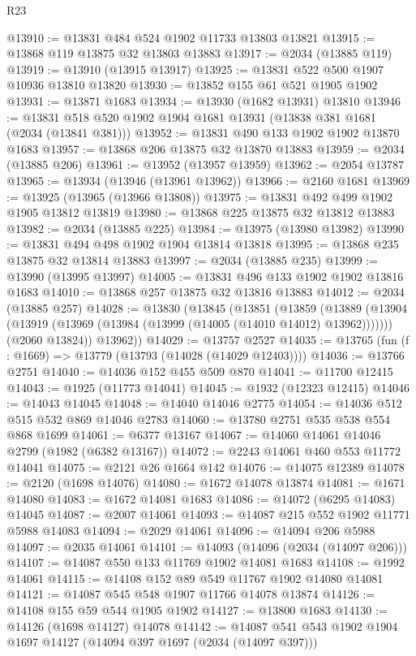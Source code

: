 \begin{lexlean}{R23}
\begin{coremodule}
@13910 := @13831 @484 @524 @1902 @11733 @13803 @13821
@13915 := @13868 @119 @13875 @32 @13803 @13883
@13917 := @2034 (@13885 @119)
@13919 := @13910 (@13915 @13917)
@13925 := @13831 @522 @500 @1907 @10936 @13810 @13820
@13930 := @13852 @155 @61 @521 @1905 @1902
@13931 := @13871 @1683
@13934 := @13930 (@1682 @13931) @13810
@13946 := @13831 @518 @520 @1902 @1904 @1681 @13931 (@13838 @381 @1681 (@2034 (@13841 @381)))
@13952 := @13831 @490 @133 @1902 @1902 @13870 @1683
@13957 := @13868 @206 @13875 @32 @13870 @13883
@13959 := @2034 (@13885 @206)
@13961 := @13952 (@13957 @13959)
@13962 := @2054 @13787
@13965 := @13934 (@13946 (@13961 @13962))
@13966 := @2160 @1681
@13969 := @13925 (@13965 (@13966 @13808))
@13975 := @13831 @492 @499 @1902 @1905 @13812 @13819
@13980 := @13868 @225 @13875 @32 @13812 @13883
@13982 := @2034 (@13885 @225)
@13984 := @13975 (@13980 @13982)
@13990 := @13831 @494 @498 @1902 @1904 @13814 @13818
@13995 := @13868 @235 @13875 @32 @13814 @13883
@13997 := @2034 (@13885 @235)
@13999 := @13990 (@13995 @13997)
@14005 := @13831 @496 @133 @1902 @1902 @13816 @1683
@14010 := @13868 @257 @13875 @32 @13816 @13883
@14012 := @2034 (@13885 @257)
@14028 := @13830
    (@13845
      (@13851
        (@13859
          (@13889 (@13904 (@13919 (@13969 (@13984 (@13999 (@14005 (@14010 @14012) @13962)))))))
          (@2060 @13824))
        @13962))
@14029 := @13757 @2527
@14035 := @13765 (fun (f : @1669) => @13779 (@13793 (@14028 (@14029 @12403))))
@14036 := @13766 @2751
@14040 := @14036 @152 @455 @509 @870
@14041 := @11700 @12415
@14043 := @1925 (@11773 @14041)
@14045 := @1932 (@12323 @12415)
@14046 := @14043 @14045
@14048 := @14040 @14046 @2775
@14054 := @14036 @512 @515 @532 @869 @14046 @2783
@14060 := @13780 @2751 @535 @538 @554 @868 @1699
@14061 := @6377 @13167
@14067 := @14060 @14061 @14046 @2799 (@1982 (@6382 @13167))
@14072 := @2243 @14061 @460 @553 @11772 @14041
@14075 := @2121 @26 @1664 @142
@14076 := @14075 @12389
@14078 := @2120 (@1698 @14076)
@14080 := @1672 @14078 @13874
@14081 := @1671 @14080
@14083 := @1672 @14081 @1683
@14086 := @14072 (@6295 @14083) @14045
@14087 := @2007 @14061
@14093 := @14087 @215 @552 @1902 @11771 @5988 @14083
@14094 := @2029 @14061
@14096 := @14094 @206 @5988
@14097 := @2035 @14061
@14101 := @14093 (@14096 (@2034 (@14097 @206)))
@14107 := @14087 @550 @133 @11769 @1902 @14081 @1683
@14108 := @1992 @14061
@14115 := @14108 @152 @89 @549 @11767 @1902 @14080 @14081
@14121 := @14087 @545 @548 @1907 @11766 @14078 @13874
@14126 := @14108 @155 @59 @544 @1905 @1902
@14127 := @13800 @1683
@14130 := @14126 (@1698 @14127) @14078
@14142 := @14087 @541 @543 @1902 @1904 @1697 @14127 (@14094 @397 @1697 (@2034 (@14097 @397)))

\end{coremodule}
\end{lexlean}
